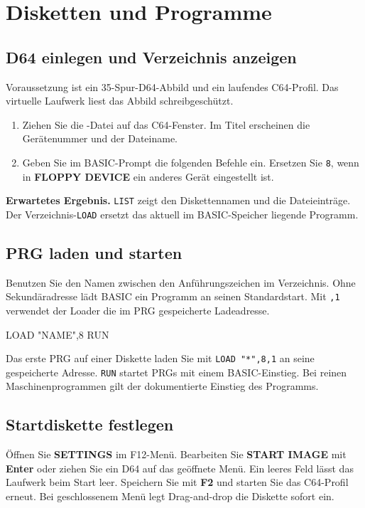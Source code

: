 \documentclass[fontsize=10.2bp,DIV=calc,oneside,open=any,headings=normal,numbers=noenddot]{scrbook}
\newcommand{\ui}[1]{\textbf{#1}}
\begin{document}
\clearpage
\section{Disketten und Programme}\label{ch:disk}

\subsection{D64 einlegen und Verzeichnis anzeigen}
Voraussetzung ist ein 35-Spur-D64-Abbild und ein laufendes C64-Profil.
Das virtuelle Laufwerk liest das Abbild schreibgeschützt.

\begin{enumerate}
  \item Ziehen Sie die -Datei auf das C64-Fenster. Im Titel erscheinen
    die Gerätenummer und der Dateiname.
  \item Geben Sie im BASIC-Prompt die folgenden Befehle ein. Ersetzen Sie
    \texttt{8}, wenn in \ui{FLOPPY DEVICE} ein anderes Gerät eingestellt ist.
\end{enumerate}

\textbf{Erwartetes Ergebnis.} \texttt{LIST} zeigt den Diskettennamen und die
Dateieinträge. Der Verzeichnis-\texttt{LOAD} ersetzt das aktuell im
BASIC-Speicher liegende Programm.

\subsection{PRG laden und starten}
Benutzen Sie den Namen zwischen den Anführungszeichen im Verzeichnis. Ohne
Sekundäradresse lädt BASIC ein Programm an seinen Standardstart. Mit
\texttt{,1} verwendet der Loader die im PRG gespeicherte Ladeadresse.

\begin{commandblock}
LOAD "NAME",8
RUN
\end{commandblock}

Das erste PRG auf einer Diskette laden Sie mit \texttt{LOAD "*",8,1} an seine
gespeicherte Adresse. \texttt{RUN} startet PRGs mit einem BASIC-Einstieg.
Bei reinen Maschinenprogrammen gilt der dokumentierte Einstieg des Programms.

\subsection{Startdiskette festlegen}
Öffnen Sie \ui{SETTINGS} im F12-Menü. Bearbeiten Sie \ui{START IMAGE} mit
\ui{Enter} oder ziehen Sie ein D64 auf das geöffnete Menü. Ein leeres Feld
lässt das Laufwerk beim Start leer. Speichern Sie mit \ui{F2} und starten Sie
das C64-Profil erneut. Bei geschlossenem Menü legt Drag-and-drop die Diskette
sofort ein.
\end{document}
